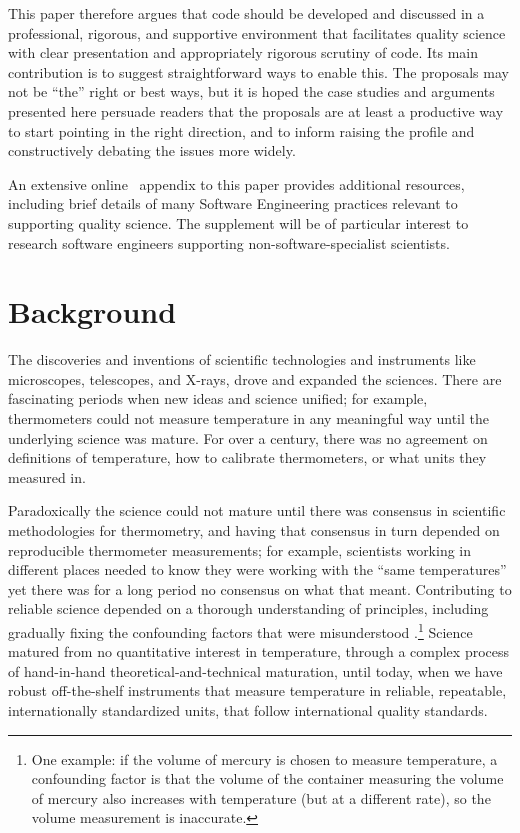 \documentclass{comjnl}
\begin{document}
This paper therefore argues that code should be developed and discussed in a professional, rigorous, and supportive environment that facilitates quality science with clear presentation and appropriately rigorous scrutiny of code. Its main contribution is to suggest straightforward ways to enable this. The proposals may not be ``the'' right or best ways, but it is hoped the case studies and arguments presented here persuade readers that the proposals are at least a productive way to start pointing in the right direction, and to inform raising the profile and constructively debating the issues more widely. 

An extensive online \supplement\ appendix to this paper provides additional resources, including brief details of many Software Engineering practices relevant to supporting quality science. The supplement will be of particular interest to research software engineers supporting non-software-specialist scientists.

\section{Background}
The discoveries and inventions of scientific technologies and instruments like microscopes, telescopes, and X-rays, drove and expanded the sciences. There are fascinating periods when new ideas and science unified; for example, thermometers could not measure temperature in any meaningful way until the underlying science was mature. For over a century, there was no agreement on definitions of temperature, how to calibrate thermometers, or what units they measured in. 

Paradoxically the science could not mature until there was consensus in scientific methodologies for thermometry, and having that consensus in turn depended on reproducible thermometer measurements; for example, scientists working in different places needed to know they were working with the ``same temperatures'' yet there was for a long period no consensus on what that meant. Contributing to reliable science depended on a thorough understanding of principles, including gradually fixing the confounding factors that were misunderstood \cite{temperature}.\footnote{One example: if the volume of mercury is chosen to measure temperature, a confounding factor is that the volume of the container measuring the volume of mercury also increases with temperature (but at a different rate), so the volume measurement is inaccurate.} 
Science matured from no quantitative interest in temperature, through a complex process of hand-in-hand theoretical-and-technical maturation, until today, when we have robust off-the-shelf instruments that measure temperature in reliable, repeatable, internationally standardized units, that follow international quality standards.
\end{document}
